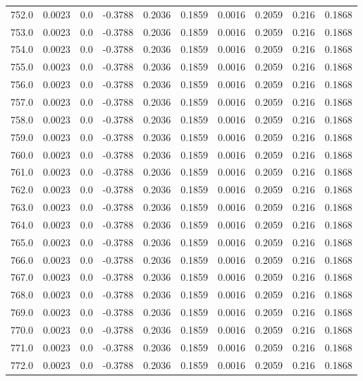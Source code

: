\begin{longtable}{lrrrrrrrrr}
752.0 & 0.0023 & 0.0 & -0.3788 & 0.2036 & 0.1859 & 0.0016 & 0.2059 & 0.216 & 0.1868 \\
753.0 & 0.0023 & 0.0 & -0.3788 & 0.2036 & 0.1859 & 0.0016 & 0.2059 & 0.216 & 0.1868 \\
754.0 & 0.0023 & 0.0 & -0.3788 & 0.2036 & 0.1859 & 0.0016 & 0.2059 & 0.216 & 0.1868 \\
755.0 & 0.0023 & 0.0 & -0.3788 & 0.2036 & 0.1859 & 0.0016 & 0.2059 & 0.216 & 0.1868 \\
756.0 & 0.0023 & 0.0 & -0.3788 & 0.2036 & 0.1859 & 0.0016 & 0.2059 & 0.216 & 0.1868 \\
757.0 & 0.0023 & 0.0 & -0.3788 & 0.2036 & 0.1859 & 0.0016 & 0.2059 & 0.216 & 0.1868 \\
758.0 & 0.0023 & 0.0 & -0.3788 & 0.2036 & 0.1859 & 0.0016 & 0.2059 & 0.216 & 0.1868 \\
759.0 & 0.0023 & 0.0 & -0.3788 & 0.2036 & 0.1859 & 0.0016 & 0.2059 & 0.216 & 0.1868 \\
760.0 & 0.0023 & 0.0 & -0.3788 & 0.2036 & 0.1859 & 0.0016 & 0.2059 & 0.216 & 0.1868 \\
761.0 & 0.0023 & 0.0 & -0.3788 & 0.2036 & 0.1859 & 0.0016 & 0.2059 & 0.216 & 0.1868 \\
762.0 & 0.0023 & 0.0 & -0.3788 & 0.2036 & 0.1859 & 0.0016 & 0.2059 & 0.216 & 0.1868 \\
763.0 & 0.0023 & 0.0 & -0.3788 & 0.2036 & 0.1859 & 0.0016 & 0.2059 & 0.216 & 0.1868 \\
764.0 & 0.0023 & 0.0 & -0.3788 & 0.2036 & 0.1859 & 0.0016 & 0.2059 & 0.216 & 0.1868 \\
765.0 & 0.0023 & 0.0 & -0.3788 & 0.2036 & 0.1859 & 0.0016 & 0.2059 & 0.216 & 0.1868 \\
766.0 & 0.0023 & 0.0 & -0.3788 & 0.2036 & 0.1859 & 0.0016 & 0.2059 & 0.216 & 0.1868 \\
767.0 & 0.0023 & 0.0 & -0.3788 & 0.2036 & 0.1859 & 0.0016 & 0.2059 & 0.216 & 0.1868 \\
768.0 & 0.0023 & 0.0 & -0.3788 & 0.2036 & 0.1859 & 0.0016 & 0.2059 & 0.216 & 0.1868 \\
769.0 & 0.0023 & 0.0 & -0.3788 & 0.2036 & 0.1859 & 0.0016 & 0.2059 & 0.216 & 0.1868 \\
770.0 & 0.0023 & 0.0 & -0.3788 & 0.2036 & 0.1859 & 0.0016 & 0.2059 & 0.216 & 0.1868 \\
771.0 & 0.0023 & 0.0 & -0.3788 & 0.2036 & 0.1859 & 0.0016 & 0.2059 & 0.216 & 0.1868 \\
772.0 & 0.0023 & 0.0 & -0.3788 & 0.2036 & 0.1859 & 0.0016 & 0.2059 & 0.216 & 0.1868 \\

\end{longtable}
